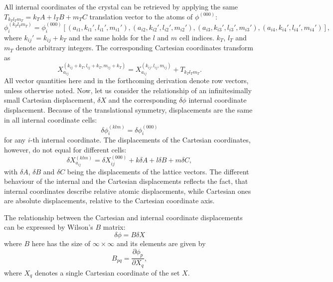 \documentclass[prl,aps,preprint,superbib,12pt]{revtex4}
\begin{document}
All internal coordinates of the crystal can be retrieved
by applying the same $T_{k_{T}l_{T}m_{T}}=k_{T}A+l_{T}B+m_{T}C$ 
translation vector to the atoms of $\phi^{(000)}$: 
\begin{equation}
\phi^{(k_{T}l_{T}m_{T})}_{i}=\phi^{(000)}_{i}[
(a_{i1},k_{i1}',l_{i1}',m_{i1}'),
(a_{i2},k_{i2}',l_{i2}',m_{i2}'),
(a_{i3},k_{i3}',l_{i3}',m_{i3}'),
(a_{i4},k_{i4}',l_{i4}',m_{i4}')] ,
\end{equation}
where $k_{ij}'=k_{ij}+k_{T}$ and the same holds for the $l$ and $m$ 
cell indices.
$k_{T}$, $l_{T}$ and $m_{T}$ denote arbitrary integers.
The corresponding Cartesian coordinates transform as
\begin{equation}
X^{(k_{ij}+k_{T},l_{ij}+k_{T},m_{ij}+k_{T})}_{a_{ij}} 
= X^{(k_{ij},l_{ij},m_{ij})}_{a_{ij}} + T_{k_{T}l_{T}m_{T}} .
\end{equation} 
All vector quantities here and in the forthcoming derivation
denote row vectors, unless otherwise noted.
Now, let us consider the relationship of an infinitesimally small
Cartesian displacement, $\delta X$ and the corresponding $\delta \phi$
internal coordinate displacement.
Because of the translational symmetry, displacements are the same
in all internal coordinate cells:
\begin{equation}
\delta \phi^{(klm)}_{i} = \delta \phi^{(000)}_{i} 
\end{equation}
for any $i$-th internal coordinate.
The displacements of the Cartesian coordinates, however, do not equal
for different cells: 
\begin{equation} \label{cartdispl}
\delta X^{(klm)}_{a_{ij}} = \delta X^{(000)}_{ij} + k \delta A 
+ l \delta B + m \delta C ,
\end{equation}
with $\delta A$, $\delta B$ and $\delta C$
being the displacements of the lattice vectors. 
The different behaviour of the internal and the Cartesian displacements
reflects the fact, that internal coordinates describe relative
atomic displacements, while Cartesian ones are absolute displacements, 
relative to the Cartesian coordinate axis.

The relationship between the Cartesian and internal coordinate 
displacements can be expressed by Wilson's $B$ matrix:
\begin{equation}
\delta \phi = B \delta X
\end{equation}
where $B$ here has the size of $\infty \times \infty$ and its
elements are given by
\begin{equation}
B_{pq}= \frac{\partial \phi_{p}}{\partial X_{q}} , 
\end{equation}
where $X_{q}$ denotes a single Cartesian coordinate of the set $X$.
\end{document}
